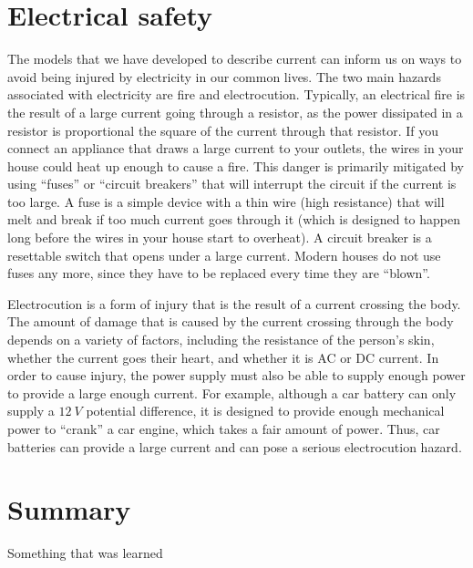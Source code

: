\section{Electrical safety}
The models that we have developed to describe current can inform us on ways to avoid being injured by electricity in our common lives. The two main hazards associated with electricity are fire and electrocution. Typically, an electrical fire is the result of a large current going through a resistor, as the power dissipated in a resistor is proportional the square of the current through that resistor. If you connect an appliance that draws a large current to your outlets, the wires in your house could heat up enough to cause a fire. This danger is primarily mitigated by using ``fuses'' or ``circuit breakers'' that will interrupt the circuit if the current is too large. A fuse is a simple device with a thin wire (high resistance) that will melt and break if too much current goes through it (which is designed to happen long before the wires in your house start to overheat). A circuit breaker is a resettable switch that opens under a large current. Modern houses do not use fuses any more, since they have to be replaced every time they are ``blown''.

Electrocution is a form of injury that is the result of a current crossing the body. The amount of damage that is caused by the current crossing through the body depends on a variety of factors, including the resistance of the person's skin, whether the current goes their heart, and whether it is AC or DC current. In order to cause injury, the power supply must also be able to supply enough power to provide a large enough current. For example, although a car battery can only supply a $\SI{12}{V}$ potential difference, it is designed to provide enough mechanical power to ``crank'' a car engine, which takes a fair amount of power. Thus, car batteries can provide a large current and can pose a serious electrocution hazard.






\newpage
\section{Summary}

\begin{chapterSummary}
 Something that was learned
\end{chapterSummary}

